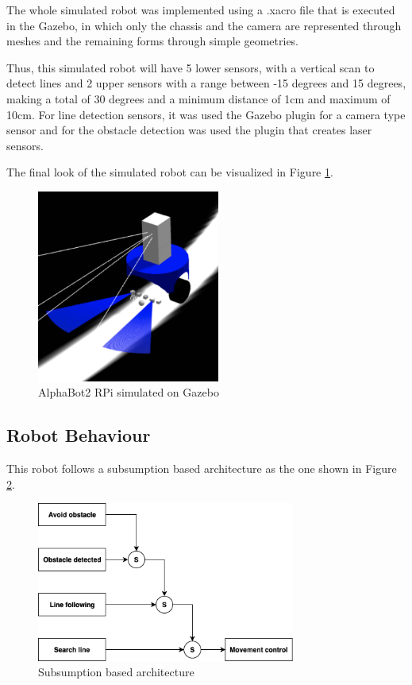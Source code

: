 \documentclass[conference]{IEEEtran}
\begin{document}
The whole simulated robot was implemented using a .xacro file that is executed in the Gazebo, in which only the chassis and the camera are represented through meshes and the remaining forms through simple geometries.

Thus, this simulated robot will have 5 lower sensors, with a vertical scan to detect lines and 2 upper sensors with a range between -15 degrees and 15 degrees, making a total of 30 degrees and a minimum distance of 1cm and maximum of 10cm. For line detection sensors, it was used the Gazebo plugin for a camera type sensor and for the obstacle detection was used the plugin that creates laser sensors.

The final look of the simulated robot can be visualized in Figure \ref{fig:fig4}.

\begin{figure}[H]
    \centering
    \includegraphics[width=6cm]{Simulated-robot.png}
    \caption{AlphaBot2 RPi simulated on Gazebo}
    \label{fig:fig4}
\end{figure}

\subsection{Robot Behaviour} \label{behaviour}

This robot follows a subsumption based architecture as the one shown in Figure \ref{fig:fig5}.

\begin{figure}[H]
    \centering
    \includegraphics[width=8.5cm]{Subsumption.png}
    \caption{Subsumption based architecture}
    \label{fig:fig5}
\end{figure}
\end{document}
